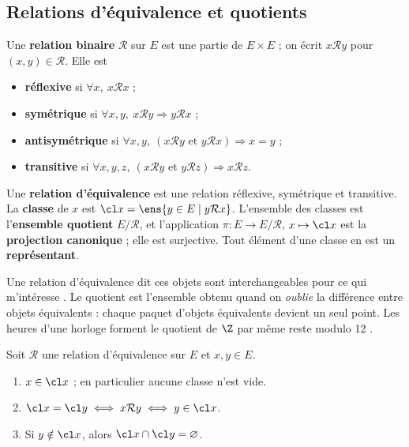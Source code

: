 \subsection{Relations d'équivalence et quotients}
\begin{definition}
Une \textbf{relation binaire} $\mathcal R$ sur $E$ est une partie de $E\times E$ ; on écrit $x\mathcal R y$ pour $(x,y)\in\mathcal R$. Elle est
\begin{itemize}
\item \textbf{réflexive} si $\forall x,\ x\mathcal R x$ ;
\item \textbf{symétrique} si $\forall x,y,\ x\mathcal R y\Rightarrow y\mathcal R x$ ;
\item \textbf{antisymétrique} si $\forall x,y,\ (x\mathcal R y \text{ et } y\mathcal R x)\Rightarrow x=y$ ;
\item \textbf{transitive} si $\forall x,y,z,\ (x\mathcal R y \text{ et } y\mathcal R z)\Rightarrow x\mathcal R z$.
\end{itemize}
\end{definition}
\begin{definition}\label{def-equiv}
Une \textbf{relation d'équivalence} est une relation réflexive, symétrique et transitive. La \textbf{classe} de $x$ est $\cl x=\ens{y\in E\mid y\mathcal R x}$. L'ensemble des classes est l'\textbf{ensemble quotient} $E/\mathcal R$, et l'application $\pi:E\to E/\mathcal R$, $x\mapsto\cl x$ est la \textbf{projection canonique} ; elle est surjective. Tout élément d'une classe en est un \textbf{représentant}.
\end{definition}
\begin{intuition}
Une relation d'équivalence dit \og ces objets sont interchangeables pour ce qui m'intéresse \fg. Le quotient est l'ensemble obtenu quand on \emph{oublie} la différence entre objets équivalents : chaque paquet d'objets équivalents devient un seul point. Les heures d'une horloge forment le quotient de $\Z$ par \og même reste modulo 12 \fg.
\end{intuition}
\begin{proposition}\label{prop-classes}
Soit $\mathcal R$ une relation d'équivalence sur $E$ et $x,y\in E$.
\begin{enumerate}
\item $x\in\cl x$ ; en particulier aucune classe n'est vide.
\item $\cl x=\cl y\iff x\mathcal R y \iff y\in\cl x$.
\item Si $y\notin\cl x$, alors $\cl x\cap\cl y=\varnothing$.
\end{enumerate}
\end{proposition}
